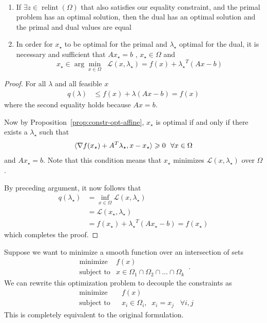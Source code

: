 \begin{theorem}\quad\\
\begin{enumerate}
\item If $\exists z \in \operatorname{rel int} (\Omega) $ that also satisfies our equality constraint,  and the primal problem has an optimal solution, then the dual has an optimal solution and the primal and dual values are equal
\item In order for $x_\star$ to be optimal for the primal and $\lambda_\star$ optimal for the dual, it is necessary and sufficient that $Ax_\star = b$ , $x_\star \in \Omega$ and $$x_\star \in \arg\min_{x\in \Omega}\;\; \mathcal{L} (x , \lambda_\star) = f(x) + {\lambda_\star}^T (Ax - b)$$
\end{enumerate}
\end{theorem}
\begin{proof}
For all $\lambda$ and all feasible $x$
\begin{align*}
q(\lambda)&\leq  f(x) + \lambda(Ax -b)= f(x)
\end{align*}
where the second equality holds because $Ax=b$.

Now by Proposition~\ref{prop:constr-opt-affine}, $x_\star$ is optimal if and only if there exists a $\lambda_\star$ such that
\[
 \langle \nabla f(x_\star) + A^T \lambda_\star, x- x_\star \rangle \geq 0~~\forall x\in \Omega\\
 \]
and $Ax_\star=b$.  Note that this condition means that $x_\star$ minimizes $\mathcal{L}(x,\lambda_\star)$ over $\Omega$.

  By preceding argument, it now follows that
  \begin{align*} 
  q(\lambda_\star) &= \inf_{x \in \Omega} \mathcal{L}(x, \lambda_\star)\\
  &= \mathcal{L}(x_\star, \lambda_\star)\\
  & = f(x_\star) + {\lambda_\star}^T(Ax_\star - b) = f(x_\star)
  \end{align*}
  which completes the proof.
\end{proof}  


   

  
  Suppose we want to minimize a smooth function over an intersection of sets \begin{equation*} 
  \begin{array}{ll}
  \text{minimize} &f(x)\\
  \text{subject to} &x \in \Omega_1 \cap \Omega_2 \cap \dots \cap \Omega_k
  \end{array}\,.
  \end{equation*}
 We can rewrite this optimization problem to decouple the constraints as
   \begin{equation*} 
  \begin{aligned} 
  &\text{minimize} &&f(x)\\
  &\text{subject to} &&x_i \in \Omega_i, \;\; x_i = x_j \;\;\;\forall i,j
  \end{aligned}
  \end{equation*}
 This is completely equivalent to the original formulation. 
   
